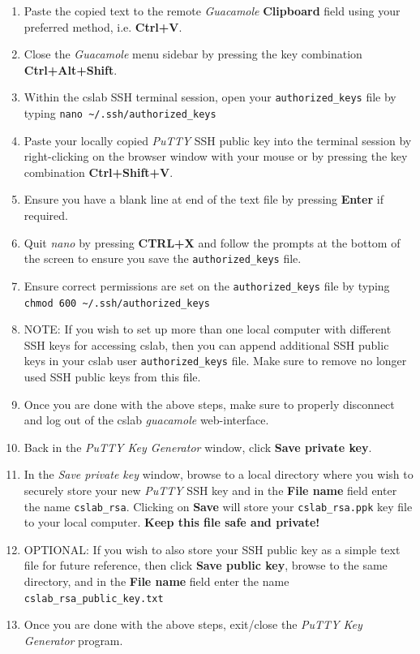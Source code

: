 \documentclass[12pt]{article}
\begin{document}
\begin{flushleft}
\begin{enumerate}
  \item Paste the copied text to the remote \textit{Guacamole} \textbf{Clipboard} field using your preferred method, i.e. \textbf{Ctrl+V}.
  \item Close the \textit{Guacamole} menu sidebar by pressing the key combination \textbf{Ctrl+Alt+Shift}.
  \item Within the cslab SSH terminal session, open your \verb|authorized_keys| file by typing \break
    \verb|nano ~/.ssh/authorized_keys|
  \item Paste your locally copied \textit{PuTTY} SSH public key into the terminal session by right-clicking on the browser window with your mouse or by pressing the key combination \textbf{Ctrl+Shift+V}.
  \item Ensure you have a blank line at end of the text file by pressing \textbf{Enter} if required.
  \item Quit \textit{nano} by pressing \textbf{CTRL+X} and follow the prompts at the bottom of the screen to ensure you save the \verb|authorized_keys| file.
  \item Ensure correct permissions are set on the \verb|authorized_keys| file by typing \break
    \verb|chmod 600 ~/.ssh/authorized_keys|
  \item NOTE: If you wish to set up more than one local computer with different SSH keys for accessing cslab, then you can append additional SSH public keys in your cslab user \verb|authorized_keys| file. Make sure to remove no longer used SSH public keys from this file.
  \item Once you are done with the above steps, make sure to properly disconnect and log out of the cslab \textit{guacamole} web-interface.
  \item Back in the \textit{PuTTY Key Generator} window, click \textbf{Save private key}.
  \item In the \textit{Save private key} window, browse to a local directory where you wish to securely store your new \textit{PuTTY} SSH key and in the \textbf{File name} field enter the name \verb|cslab_rsa|. Clicking on \textbf{Save} will store your \verb|cslab_rsa.ppk| key file to your local computer. \textbf{Keep this file safe and private!}
  \item OPTIONAL: If you wish to also store your SSH public key as a simple text file for future reference, then click \textbf{Save public key}, browse to the same directory, and in the \textbf{File name} field enter the name \verb|cslab_rsa_public_key.txt|
  \item Once you are done with the above steps, exit/close the \textit{PuTTY Key Generator} program.

\end{enumerate}
\end{flushleft}
\end{document}
